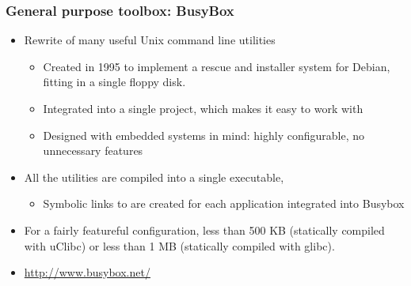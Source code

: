 \begin{frame}
  \frametitle{General purpose toolbox: BusyBox}
  \begin{itemize}
  \item Rewrite of many useful Unix command line utilities
    \begin{itemize}
    \item Created in 1995 to implement a rescue and installer
     system for Debian, fitting in a single floppy disk.
    \item Integrated into a single project, which makes it easy to
      work with
    \item Designed with embedded systems in mind: highly configurable,
      no unnecessary features
    \end{itemize}
  \item All the utilities are compiled into a single executable,
    \begin{itemize}
    \item Symbolic links to  are created for each
      application integrated into Busybox
    \end{itemize}
  \item For a fairly featureful configuration, less than 500 KB
    (statically compiled with uClibc) or less than 1 MB (statically
    compiled with glibc).
  \item   \url{http://www.busybox.net/}
  \end{itemize}
\end{frame}

